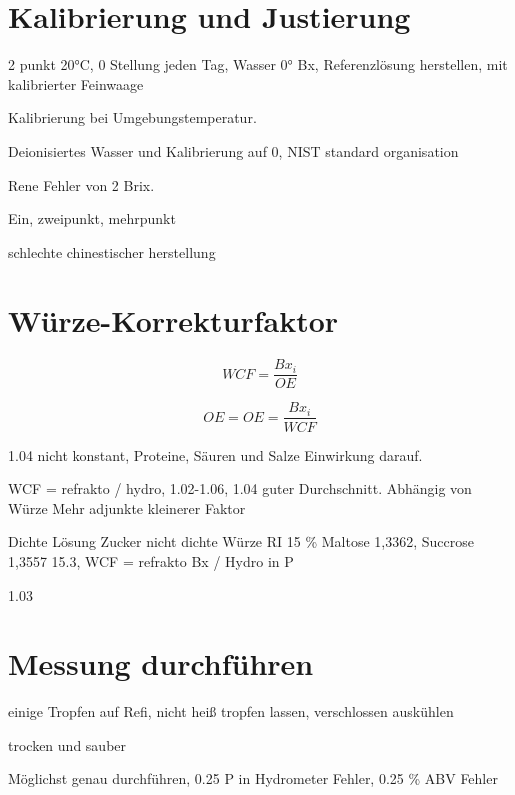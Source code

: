 \documentclass[a4paper,parskip=half]{scrartcl}
\newcommand{\bxi}{\mathit{Bx}_i}
\newcommand{\bxic}{\mathit{OE}}
\newcommand{\oex}{\mathit{OE}}
\newcommand{\wcf}{\mathit{WCF}}
\begin{document}
\section*{Kalibrierung und Justierung}

2 punkt 20°C, 0 Stellung jeden Tag, Wasser 0° Bx, Referenzlösung herstellen,
mit kalibrierter Feinwaage
\autocite{Terrill2013}

Kalibrierung bei Umgebungstemperatur.
\autocite{Bonham2001}

Deionisiertes Wasser und Kalibrierung auf 0, NIST standard
organisation
\autocite{Depalma2017}

Rene Fehler von 2 Brix.

Ein, zweipunkt, mehrpunkt
\autocite{Earl2015}

schlechte chinestischer herstellung
\autocite{Troester2012}

\section*{Würze-Korrekturfaktor}

\begin{equation}
\wcf = \frac{\bxi}{\mathit{OE}}
\end{equation}

\begin{equation}
\oex = \bxic = \frac{\bxi}{\wcf}
\end{equation}

1.04 nicht konstant, Proteine, Säuren und Salze Einwirkung
darauf.
\autocite{Roberts1950}

WCF = refrakto / hydro, 1.02-1.06, 1.04 guter Durchschnitt. Abhängig von Würze
Mehr adjunkte kleinerer Faktor
\autocite{Terrill2013}

Dichte Lösung Zucker nicht dichte Würze
RI 15 \% Maltose 1,3362, Succrose 1,3557 15.3, 
WCF = refrakto Bx  / Hydro in P
\autocite{Bonham2001}

\autocite{Weiss2016} 1.03

\section*{Messung durchführen}

einige Tropfen auf Refi, nicht heiß tropfen lassen, verschlossen auskühlen
\autocite{Terrill2013}

trocken und sauber
\autocite{Bonham2001}

Möglichst genau durchführen, 0.25 P in Hydrometer Fehler,
0.25 \% ABV Fehler
\autocite{Bonham2001}
\end{document}
